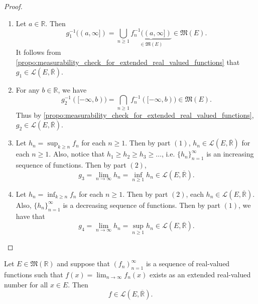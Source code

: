 \documentclass[notoc,notitlepage]{tufte-book}
\begin{document}
\begin{proof}
  \begin{enumerate}
    \item Let $a \in \mathbb{R}$. Then
      \begin{equation*}
        g_1^{-1}((a, \infty]) = \bigcup_{n \geq 1} \underbrace{f_n^{-1} ((a,
        \infty])}_{\in \mathfrak{M}(E)} \in \mathfrak{M}(E).
      \end{equation*}
      It follows from
      \cref{propo:measurability_check_for_extended_real_valued_functions} that
      $g_1 \in \mathcal{L}(E, \overline{\mathbb{R}})$.

    \item {} For any $b \in \mathbb{R}$, we have
      \begin{equation*}
        g_2^{-1}([-\infty, b)) = \bigcap_{n \geq 1} f_n^{-1}([-\infty, b)) \in
        \mathfrak{M}(E).
      \end{equation*}
      Thus by
      \cref{propo:measurability_check_for_extended_real_valued_functions}, $g_2
      \in \mathcal{L}(E, \overline{\mathbb{R}})$.

    \item Let $h_n = \sup_{k \geq n} f_n$ for each $n \geq 1$. Then by part
      $(1)$, $h_n \in \mathcal{L}(E, \overline{\mathbb{R}})$ for each $n \geq
      1$. Also, notice that $h_1 \geq h_2 \geq h_3 \geq \hdots$, i.e. $\{ h_n
      \}_{n=1}^{\infty}$ is an increasing sequence of functions. Then by part
      $(2)$,
      \begin{equation*}
        g_3 = \lim_{n \to \infty} h_n = \inf_{n \geq 1} h_n \in \mathcal{L}(E,
        \overline{\mathbb{R}}).
      \end{equation*}

    \item Let $h_n = \inf_{k \geq n} f_n$ for each $n \geq 1$. Then by part
      $(2)$, each $h_n \in \mathcal{L}(E, \overline{\mathbb{R}})$. Also, $\{ h_n
      \}_{n=1}^{\infty}$ is a decreasing sequence of functions. Then by part
      $(1)$, we have that
      \begin{equation*}
        g_4 = \lim_{n \to \infty} h_n = \sup_{n \geq 1} h_n \in \mathcal{L}(E,
        \overline{\mathbb{R}}).
      \end{equation*}
  \end{enumerate}
\end{proof}

\begin{crly}\label{crly:extended_limit_of_real_valued_functions}
  Let $E \in \mathfrak{M}(\mathbb{R})$ and suppose that $(f_n)_{n=1}^{\infty}$
  is a sequence of real-valued functions such that $f(x) = \lim_{n \to \infty}
  f_n(x)$ exists as an extended real-valued number for all $x \in E$. Then
  \begin{equation*}
    f \in \mathcal{L}(E, \overline{\mathbb{R}}).
  \end{equation*}
\end{crly}
\end{document}
